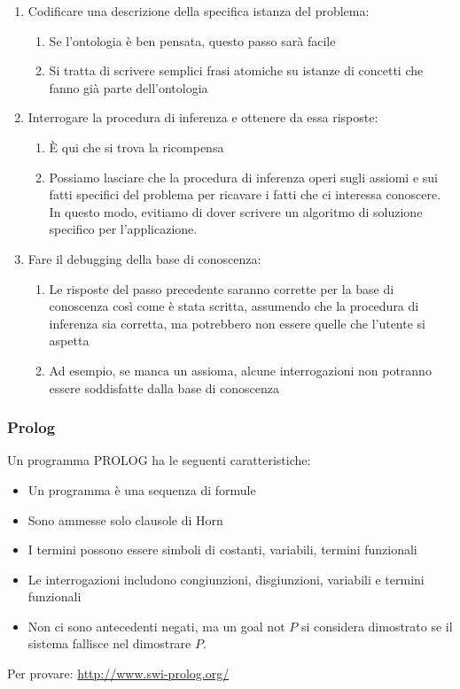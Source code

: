 \documentclass[../main.tex]{subfiles}
\begin{document}
\begin{enumerate}
\begin{enumerate}
			\item In questo modo si fissa (per quanto possibile) il significato dei termini, consentendo all'esperto di verificare il contenuto
			\item Spesso questa fase rivela concetti errati o lacune nel vocabolario che devono essere risolte tornando alla fase 3 e iterando il processo
		\end{enumerate}
		\item Codificare una descrizione della specifica istanza del problema: 
		\begin{enumerate}
			\item Se l'ontologia è ben pensata, questo passo sarà facile 
			\item Si tratta di scrivere semplici frasi atomiche su istanze di concetti che fanno già parte dell'ontologia
		\end{enumerate}
		\item Interrogare la procedura di inferenza e ottenere da essa risposte: 
		\begin{enumerate}
			\item È qui che si trova la ricompensa
			\item Possiamo lasciare che la procedura di inferenza operi sugli assiomi e sui fatti specifici del problema per ricavare i fatti che ci interessa conoscere.\\ 
			In questo modo, evitiamo di dover scrivere un algoritmo di soluzione specifico per l’applicazione.
		\end{enumerate}
		\item Fare il debugging della base di conoscenza: 
		\begin{enumerate}
			\item Le risposte del passo precedente saranno corrette per la base di conoscenza così come è stata scritta, assumendo che la procedura di inferenza sia corretta, ma potrebbero non essere quelle che l'utente si aspetta
			\item Ad esempio, se manca un assioma, alcune interrogazioni non potranno essere soddisfatte dalla base di conoscenza
		\end{enumerate}
	\end{enumerate}
	\subsubsection{Prolog}
	Un programma PROLOG ha le seguenti caratteristiche:
	\begin{itemize}
		\item Un programma è una sequenza di formule
		\item Sono ammesse solo clausole di Horn
		\item I termini possono essere simboli di costanti, variabili, termini funzionali
		\item Le interrogazioni includono congiunzioni, disgiunzioni, variabili e termini funzionali
		\item Non ci sono antecedenti negati, ma un goal not $P$ si considera dimostrato se il sistema fallisce nel dimostrare $P$.
	\end{itemize}
	Per provare: \href{http://www.swi-prolog.org/}{http://www.swi-prolog.org/}
\end{document}
